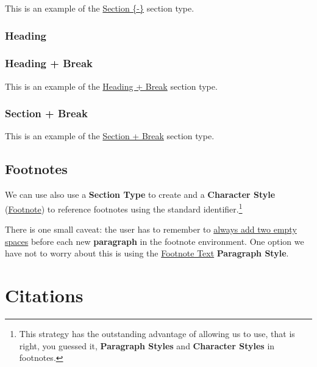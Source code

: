 \documentclass[
  12pt,
  a4paper,
  oneside,
  numbers=noenddot,
  titlepage,
  toclink=all,
  toc=bibliography]{scrbook}
\theoremstyle{definition}
\theoremstyle{definition}
\theoremstyle{definition}
\theoremstyle{plain}
\theoremstyle{plain}
\theoremstyle{plain}
\theoremstyle{plain}
\theoremstyle{plain}
\theoremstyle{remark}
\begin{document}
\protect\hypertarget{scriv35}{}{}

This is an example of the \ul{Section \{-\}} section type.

\hypertarget{sec-scriv36}{%
\subsection{Heading}\label{sec-scriv36}}

\hypertarget{sec-scriv37}{%
\subsection{Heading + Break}\label{sec-scriv37}}

This is an example of the \ul{Heading + Break} section type.

\newpage{}

\newpage{}

\hypertarget{sec-scriv38}{%
\subsection{Section + Break}\label{sec-scriv38}}

This is an example of the \ul{Section + Break} section type.

\newpage{}

\hypertarget{sec-scriv39}{%
\section{Footnotes}\label{sec-scriv39}}

We can use also use a \textbf{Section Type} to create and a
\textbf{Character Style} (\ul{Footnote}) to reference footnotes using
the standard identifier.\footnote{\protect\hypertarget{scriv40}{}{} This
  strategy has the outstanding advantage of allowing us to use, that is
  right, you guessed it, \textbf{Paragraph Styles} and \textbf{Character
  Styles} in footnotes.}

There is one small caveat: the user has to remember to \ul{always add
two empty spaces} before each new \textbf{paragraph} in the footnote
environment. One option we have not to worry about this is using the
\ul{Footnote Text} \textbf{Paragraph Style}.

\hypertarget{sec-scriv41}{%
\chapter{Citations}\label{sec-scriv41}}
\end{document}

